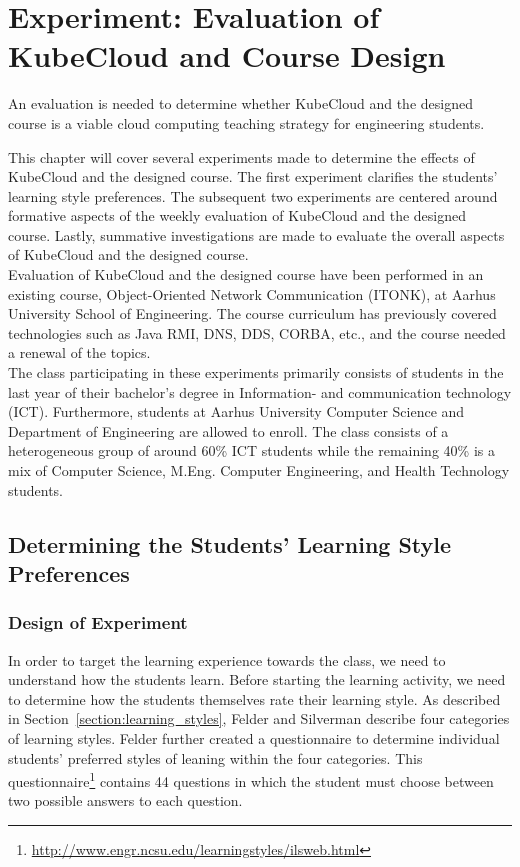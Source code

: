 \chapter{Experiment: Evaluation of KubeCloud and Course Design}
\label{chapter_experiment1_learning_experience}

\begin{theorem}
    An evaluation is needed to determine whether KubeCloud and the designed course is a viable cloud computing teaching strategy for engineering students.
\end{theorem}

\noindent
This chapter will cover several experiments made to determine the effects of KubeCloud and the designed course. The first experiment clarifies the students' learning style preferences. The subsequent two experiments are centered around formative aspects of the weekly evaluation of KubeCloud and the designed course. Lastly, summative investigations are made to evaluate the overall aspects of KubeCloud and the designed course.\\

\noindent
Evaluation of KubeCloud and the designed course have been performed in an existing course, Object-Oriented Network Communication (ITONK), at Aarhus University School of Engineering. The course curriculum has previously covered technologies such as Java RMI, DNS, DDS, CORBA, etc., and the course needed a renewal of the topics. \\

\noindent
The class participating in these experiments primarily consists of students in the last year of their bachelor's degree in Information- and communication technology (ICT). Furthermore, students at Aarhus University Computer Science and Department of Engineering are allowed to enroll. The class consists of a heterogeneous group of around 60\% ICT students while the remaining 40\% is a mix of Computer Science, M.Eng. Computer Engineering, and Health Technology students.

 


\section{Determining the Students' Learning Style Preferences}
\subsection*{Design of Experiment}
In order to target the learning experience towards the class, we need to understand how the students learn. Before starting the learning activity, we need to determine how the students themselves rate their learning style. As described in Section~\ref{section:learning_styles}, Felder and Silverman describe four categories of learning styles. Felder further created a questionnaire to determine individual students' preferred styles of leaning within the four categories. This questionnaire\footnote{\url{http://www.engr.ncsu.edu/learningstyles/ilsweb.html}} contains 44 questions in which the student must choose between two possible answers to each question. \\

